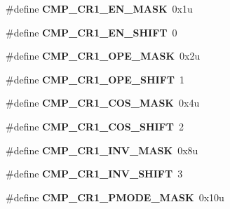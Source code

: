 \begin{DoxyCompactItemize}
\item 
\mbox{\label{group___c_m_p___register___masks_ga2492ad39a9661a1217cc26f20bd31ef2}} 
\#define {\bfseries C\+M\+P\+\_\+\+C\+R1\+\_\+\+E\+N\+\_\+\+M\+A\+SK}~0x1u
\item 
\mbox{\label{group___c_m_p___register___masks_gacaacf0894bdf41eb49de1ae81075fa2b}} 
\#define {\bfseries C\+M\+P\+\_\+\+C\+R1\+\_\+\+E\+N\+\_\+\+S\+H\+I\+FT}~0
\item 
\mbox{\label{group___c_m_p___register___masks_gaaad42787753465406dd5006f228049dd}} 
\#define {\bfseries C\+M\+P\+\_\+\+C\+R1\+\_\+\+O\+P\+E\+\_\+\+M\+A\+SK}~0x2u
\item 
\mbox{\label{group___c_m_p___register___masks_ga5c273c5f23e09e69a9589a285cbe2c24}} 
\#define {\bfseries C\+M\+P\+\_\+\+C\+R1\+\_\+\+O\+P\+E\+\_\+\+S\+H\+I\+FT}~1
\item 
\mbox{\label{group___c_m_p___register___masks_gaf8b38740c4bddec386b2b7d674f5f0fc}} 
\#define {\bfseries C\+M\+P\+\_\+\+C\+R1\+\_\+\+C\+O\+S\+\_\+\+M\+A\+SK}~0x4u
\item 
\mbox{\label{group___c_m_p___register___masks_gaaf826df5b4ff2069e2cb112f03c7b782}} 
\#define {\bfseries C\+M\+P\+\_\+\+C\+R1\+\_\+\+C\+O\+S\+\_\+\+S\+H\+I\+FT}~2
\item 
\mbox{\label{group___c_m_p___register___masks_ga562c151a4679c2b50e20d6418dcc7d99}} 
\#define {\bfseries C\+M\+P\+\_\+\+C\+R1\+\_\+\+I\+N\+V\+\_\+\+M\+A\+SK}~0x8u
\item 
\mbox{\label{group___c_m_p___register___masks_gae8bcf6f11eb6afb3967dc6e318b0c41f}} 
\#define {\bfseries C\+M\+P\+\_\+\+C\+R1\+\_\+\+I\+N\+V\+\_\+\+S\+H\+I\+FT}~3
\item 
\mbox{\label{group___c_m_p___register___masks_ga09a2757123048a40e1694dd9454982ee}} 
\#define {\bfseries C\+M\+P\+\_\+\+C\+R1\+\_\+\+P\+M\+O\+D\+E\+\_\+\+M\+A\+SK}~0x10u

\end{DoxyCompactItemize}
